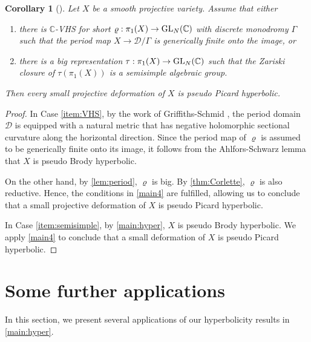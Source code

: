 \documentclass[english]{amsproc}
\theoremstyle{plain}
\newtheorem{cor}[thm]{Corollary}
\theoremstyle{definition}
\theoremstyle{remark}
\theoremstyle{plain}
\numberwithin{equation}{thm} %
\newcommand{\sD}{\mathscr{D}}
\newcommand{\bC}{\mathbb{C}}
\newcommand{\GL}{{\rm GL}}
\begin{document}
 	\begin{cor}[{\cite[Corollary E]{DMW24}}]\label{corx}
 	Let $X$ be a smooth projective variety.  Assume that either 
 	\begin{enumerate}[label=(\alph*)]
 		\item \label{item:VHS} there is  $\bC$-VHS for short $\varrho:\pi_1(X)\to \GL_N(\bC)$ with discrete monodromy $\Gamma$ such that the period map $X\to \sD/\Gamma$ is   generically finite onto the image, or
 		\item\label{item:semisimple} there is a big representation $\tau:\pi_1(X)\to \GL_N(\bC)$ such that the Zariski closure of $\tau(\pi_1(X))$ is a semisimple algebraic group.
 	\end{enumerate} Then every small projective deformation of $X$ is  pseudo Picard hyperbolic.
 \end{cor}
 \begin{proof}
 	In Case \ref{item:VHS}, by the work of Griffiths-Schmid \cite{GS69}, the period domain $\sD$ is equipped with a natural metric that has negative holomorphic sectional curvature along the horizontal direction. Since the period map of $\varrho$ is assumed to be generically finite onto its image, it follows from the Ahlfors-Schwarz lemma that $X$ is pseudo Brody hyperbolic.
 	
 	On the other hand, by \cref{lem:period}, $\varrho$ is big. By \cref{thm:Corlette}, $\varrho$ is also reductive. Hence, the conditions in \cref{main4} are fulfilled, allowing us to conclude that a small projective deformation of $X$ is  pseudo Picard hyperbolic.  
 	
 	In Case \ref{item:semisimple},  by \cref{main:hyper}, $X$ is pseudo Brody hyperbolic.   We apply \cref{main4} to conclude  that a small deformation of $X$ is  pseudo Picard hyperbolic.    
 \end{proof}
 	
	\section{Some further applications}\label{sec:application} 
In this section, we present several applications of our hyperbolicity results
  in \cref{main:hyper}. 
\end{document}
